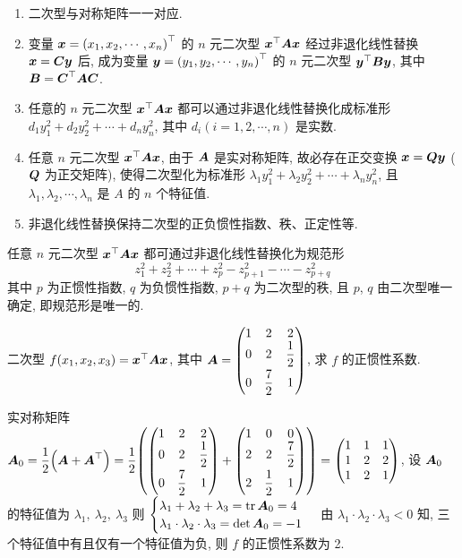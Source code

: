 \begin{enumerate}[label=(\arabic{*})]
    \item 二次型与对称矩阵一一对应.
    \item 变量 $ \vb*{x}=\left(x_{1}, x_{2}, \cdots, x_{n}\right)^{\top} $ 的 $ n $ 元二次型 $ \vb*{x}^{\top} \vb*{A} \vb*{x} $ 经过非退化线性替换 $ \vb*{x}=\vb*{C} \vb*{y} $ 后, 成为变量 $ \vb*{y}=\left(y_{1}, y_{2}, \cdots, y_{n}\right)^{\top} $ 的 $ n $ 元二次型 $ \vb*{y}^{\top} \vb*{B} \vb*{y} $, 其中 $ \vb*{B}=\vb*{C}^{\top} \vb*{A} \vb*{C} $.
    \item 任意的 $ n $ 元二次型 $ \vb*{x}^{\top} \vb*{A} \vb*{x} $ 都可以通过非退化线性替换化成标准形 $ d_{1} y_{1}^{2}+   d_{2} y_{2}^{2}+\cdots+d_{n} y_{n}^{2} $, 其中 $ d_{i}(i=1,2, \cdots, n) $ 是实数.
    \item 任意 $ n $ 元二次型 $ \vb*{x}^{\top} \vb*{A} \vb*{x} $, 由于 $ \vb*{A} $ 是实对称矩阵, 故必存在正交变换 $ \vb*{x}=\vb*{Q} \vb*{y}$ ($\vb*{Q} $ 为正交矩阵), 使得二次型化为标准形 $ \lambda_{1} y_{1}^{2}+\lambda_{2} y_{2}^{2}+\cdots+\lambda_{n} y_{n}^{2} $, 且 $ \lambda_{1}, \lambda_{2}, \cdots, \lambda_{n} $ 是 $ A $ 的 $ n $ 个特征值.
    \item 非退化线性替换保持二次型的正负惯性指数、秩、正定性等.
\end{enumerate}

\begin{theorem}[惯性定理]
    任意 $n$ 元二次型 $\vb*{x}^\top\vb*{Ax}$ 都可通过非退化线性替换化为规范形
    $$z_1^2+z_2^2+\cdots+z_p^2-z_{p+1}^2-\cdots-z_{p+q}^2$$
    其中 $p$ 为正惯性指数, $q$ 为负惯性指数, $p+q$ 为二次型的秩, 且 $p$, $q$ 由二次型唯一确定, 即规范形是唯一的.
\end{theorem}

\begin{example}
    二次型 $f(x_1,x_2,x_3)=\vb*{x}^\top\vb*{Ax}$, 其中 $\vb*{A}=\mqty(1&2&2\\0&2&\dfrac{1}{2}\\[6pt]0&\dfrac{7}{2}&1)$, 求 $f$ 的正惯性系数.
\end{example}
\begin{solution}
    实对称矩阵 $\vb*{A}_0=\dfrac{1}{2}\qty(\vb*{A}+\vb*{A}^\top)=\dfrac{1}{2}\qty(\mqty(1&2&2\\0&2&\dfrac{1}{2}\\[6pt]0&\dfrac{7}{2}&1)+\mqty(1&0&0\\2&2&\dfrac{7}{2}\\[6pt]2&\dfrac{1}{2}&1))=\mqty(1&1&1\\1&2&2\\1&2&1)$, 
    设 $\vb*{A}_0$ 的特征值为 $\lambda_1,~\lambda_2,~\lambda_3$ 则 $\begin{cases}
            \lambda_1+\lambda_2+\lambda_3=\tr\vb*{A}_0=4 \\
            \lambda_1\cdot \lambda_2\cdot \lambda_3=\det\vb*{A}_0=-1
        \end{cases}$ 由 $\lambda_1\cdot \lambda_2\cdot \lambda_3<0$ 知, 三个特征值中有且仅有一个特征值为负, 则 $f$ 的正惯性系数为 2.
\end{solution}

